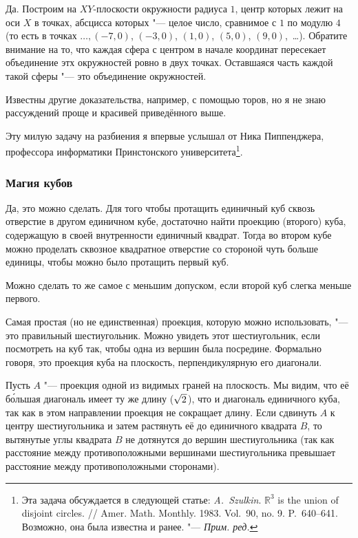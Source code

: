 \documentclass[twoside]{book}
\begin{document}
Да.
Построим на $XY$-плоскости окружности радиуса $1$, центр которых лежит
на оси $X$ в точках, абсцисса которых "--- целое число, сравнимое с $1$ по модулю $4$ (то есть в точках $\dots, (-7,0)$, $(-3,0)$, $(1,0)$, $(5,0)$, $(9,0)$,~\dots).
Обратите внимание на то, что каждая сфера с центром в начале координат
пересекает объединение этх окружностей ровно в двух точках.
Оставшаяся часть каждой такой сферы "--- это объединение окружностей.
\heart

\medskip

Известны другие доказательства, например, с помощью торов, но я не знаю рассуждений проще и красивей приведённого выше.

Эту милую задачу на разбиения я впервые услышал от Ника Пиппенджера, %
профессора информатики Принстонского университета\footnote{Эта задача обсуждается в следующей статье: 
\emph{A.~Szulkin}. $\mathbb{R}^3$ is the union of disjoint
circles. /\!/ Amer. Math. Monthly. 1983. Vol.~90,
no. 9. P.~640--641. Возможно, она была известна и ранее. "--- \emph{Прим. ред.}}.

\subsubsection*{Магия кубов}%

Да, это можно сделать.
Для того чтобы протащить единичный куб сквозь отверстие в другом единичном кубе, достаточно найти проекцию (второго) куба, содержащую в своей внутренности единичный квадрат.
Тогда во втором кубе можно проделать сквозное квадратное отверстие %
со стороной чуть больше единицы, чтобы можно было протащить первый куб.

Можно сделать то же самое с меньшим допуском, если второй куб слегка меньше первого.

Самая простая (но не единственная) проекция, которую можно использовать, "--- это правильный шестиугольник.
Можно увидеть этот шестиугольник, если посмотреть на куб так, чтобы одна из вершин была посредине.
Формально говоря, это проекция куба на плоскость, перпендикулярную его диагонали. 

Пусть $A$ "--- проекция одной из видимых граней на плоскость.
Мы видим, что её б\'{о}льшая диагональ имеет ту же длину ($\sqrt{2\mkern1mu}$), что и диагональ единичного куба, так как в этом направлении проекция не сокращает длину.
Если сдвинуть $A$ к центру шестиугольника и затем растянуть её до единичного квадрата $B$, то вытянутые углы квадрата $B$ не дотянутся до вершин шестиугольника (так как расстояние между противоположными вершинами шестиугольника превышает расстояние между противоположными сторонами).
\end{document}
